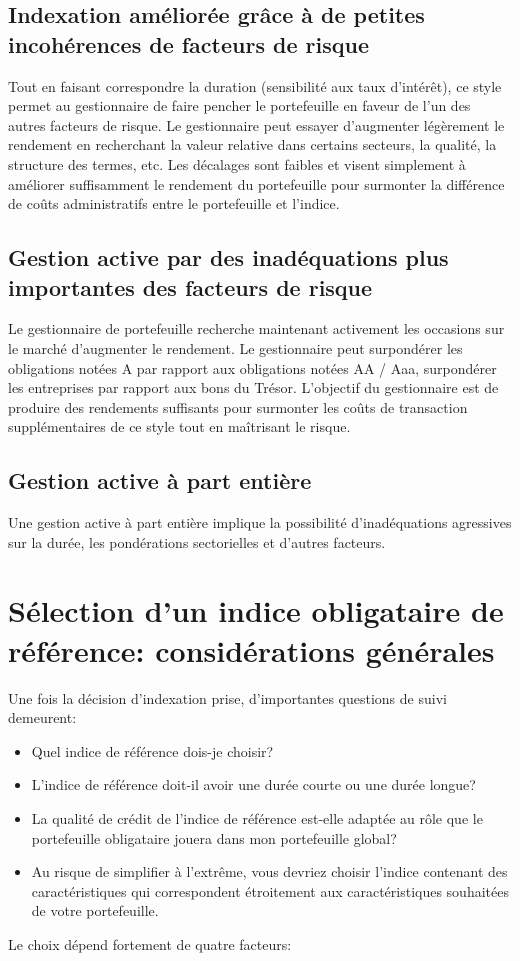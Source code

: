 \documentclass[12pt]{article}
\begin{document}
\subsection{Indexation améliorée grâce à de petites incohérences de facteurs de risque}
Tout en faisant correspondre la duration (sensibilité aux taux d'intérêt), ce style permet au gestionnaire de faire pencher le portefeuille en faveur de l'un des autres facteurs de risque. Le gestionnaire peut essayer d'augmenter légèrement le rendement en recherchant la valeur relative dans certains secteurs, la qualité, la structure des termes, etc. Les décalages sont faibles
et visent simplement à améliorer suffisamment le rendement du portefeuille pour surmonter la différence de coûts administratifs entre le portefeuille et l’indice.
\subsection{Gestion active par des inadéquations plus importantes des facteurs de risque}
Le gestionnaire de portefeuille recherche maintenant activement les occasions sur le marché d'augmenter le rendement. Le gestionnaire peut surpondérer les obligations notées A par rapport aux obligations notées AA / Aaa, surpondérer les entreprises par rapport aux bons du Trésor. L’objectif du gestionnaire est de produire des rendements suffisants pour surmonter les coûts de transaction supplémentaires de ce style tout en maîtrisant le risque.
\subsection{Gestion active à part entière}
Une gestion active à part entière implique la possibilité d'inadéquations agressives sur la durée, les pondérations sectorielles et d'autres facteurs.

\section{Sélection d'un indice obligataire de référence: considérations générales}
Une fois la décision d'indexation prise, d'importantes questions de suivi demeurent:
\begin{itemize}
\item Quel indice de référence dois-je choisir?
\item L'indice de référence doit-il avoir une durée courte ou une durée longue?
\item La qualité de crédit de l’indice de référence est-elle adaptée au rôle que le portefeuille obligataire jouera dans mon portefeuille global?
\item Au risque de simplifier à l'extrême, vous devriez choisir l'indice contenant des caractéristiques qui correspondent étroitement aux caractéristiques souhaitées de votre portefeuille.
\end{itemize}
Le choix dépend fortement de quatre facteurs:
\end{document}
